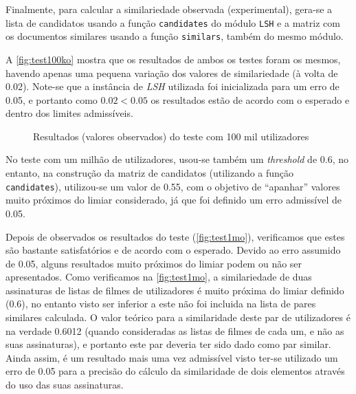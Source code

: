 \documentclass[a4paper,11pt,openright,oneside]{report}
\begin{document}
Finalmente, para calcular a similariedade observada (experimental), gera-se a lista de candidatos usando a função \texttt{candidates} do módulo \texttt{LSH} e a matriz com os documentos similares usando a função \texttt{similars}, também do mesmo módulo.

A \autoref{fig:test100ko} mostra que os resultados de ambos os testes foram os mesmos, havendo apenas uma pequena variação dos valores de similariedade (à volta de 0.02). Note-se que a instância de \textit{LSH} utilizada foi inicializada para um erro de 0.05, e portanto como $0.02 < 0.05$ os resultados estão de acordo com o esperado e dentro dos limites admissíveis.

\begin{figure}[ht]
\center
{}
\caption{Resultados (valores observados) do teste com 100 mil utilizadores}
\label{fig:test100ko}
\end{figure}

No teste com um milhão de utilizadores, usou-se também um \textit{threshold} de 0.6, no entanto, na construção da matriz de candidatos (utilizando a função \texttt{candidates}), utilizou-se um valor de 0.55, com o objetivo de ``apanhar'' valores muito próximos do limiar considerado, já que foi definido um erro admissível de 0.05.

Depois de observados os resultados do teste (\autoref{fig:test1mo}), verificamos que estes são bastante satisfatórios e de acordo com o esperado. Devido ao erro assumido de 0.05, alguns resultados muito próximos do limiar podem ou não ser apresentados. Como verificamos na \autoref{fig:test1mo}, a similariedade de duas assinaturas de listas de filmes de utilizadores é muito próxima do limiar definido (0.6), no entanto visto ser inferior a este não foi incluida na lista de pares similares calculada. O valor teórico para a similaridade deste par de utilizadores é na verdade 0.6012 (quando consideradas as listas de filmes de cada um, e não as suas assinaturas), e portanto este par deveria ter sido dado como par similar. Ainda assim, é um resultado mais uma vez admissível visto ter-se utilizado um erro de 0.05 para a precisão do cálculo da similaridade de dois elementos através do uso das suas assinaturas.
\end{document}
